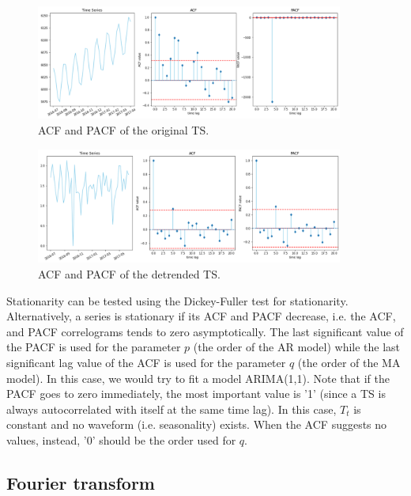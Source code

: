 \begin{figure}[hbt!]
\centering
\includegraphics[width=0.9\textwidth]{SectionLetsMath/elemStat_figures/fig_nonStationaryTS.png}
\captionsetup{type=figure}
\caption{ACF and PACF of the original TS.}
\label{fig_nonStationaryTS}
\end{figure}

\begin{figure}[hbt!]
\centering
\includegraphics[width=0.9\textwidth]{SectionLetsMath/elemStat_figures/fig_StationaryTS.png}
\captionsetup{type=figure}
\caption{ACF and PACF of the detrended TS.}
\label{fig_StationaryTS}
\end{figure}

Stationarity can be tested using the Dickey-Fuller test for stationarity. Alternatively, a series is stationary if its ACF and PACF decrease, i.e. the ACF, and PACF correlograms tends to zero asymptotically. The last significant value of the PACF is used for the parameter $p$ (the order of the AR model) while the last significant lag value of the ACF is used for the parameter $q$ (the order of the MA model). In this case, we would try to fit a model ARIMA(1,1). Note that if the PACF goes to zero immediately, the most important value is '1' (since a TS is always autocorrelated with itself at the same time lag). In this case, $T_t$ is constant and no waveform (i.e. seasonality) exists. When the ACF suggests no values, instead, '0' should be the order used for $q$.

\subsection{Fourier transform} \label{secFourier}

